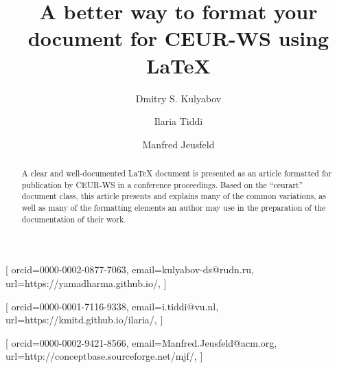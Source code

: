 \documentclass[
]{ceurart}
\begin{document}


\title{A better way to format your document for CEUR-WS using LaTeX}

\tnotemark[1]

\author[1,2]{Dmitry S. Kulyabov}[%
  orcid=0000-0002-0877-7063,
  email=kulyabov-ds@rudn.ru,
  url=https://yamadharma.github.io/,
]
\cormark[1]
\fnmark[1]
\address[1]{Peoples' Friendship University of Russia (RUDN University),
  6 Miklukho-Maklaya St, Moscow, 117198, Russian Federation}
\address[2]{Joint Institute for Nuclear Research,
  6 Joliot-Curie, Dubna, Moscow region, 141980, Russian Federation}

\author[3]{Ilaria Tiddi}[%
  orcid=0000-0001-7116-9338,
  email=i.tiddi@vu.nl,
  url=https://kmitd.github.io/ilaria/,
]
\fnmark[1]
\address[3]{Vrije Universiteit Amsterdam, De Boelelaan 1105, 1081 HV Amsterdam, The Netherlands}

\author[4]{Manfred Jeusfeld}[%
  orcid=0000-0002-9421-8566,
  email=Manfred.Jeusfeld@acm.org,
  url=http://conceptbase.sourceforge.net/mjf/,
]
\fnmark[1]
\address[4]{University of Skövde, Högskolevägen 1, 541 28 Skövde, Sweden}


\begin{abstract}
  A clear and well-documented \LaTeX{} document is presented as an
  article formatted for publication by CEUR-WS in a conference
  proceedings. Based on the ``ceurart'' document class, this article
  presents and explains many of the common variations, as well as many
  of the formatting elements an author may use in the preparation of
  the documentation of their work.
\end{abstract}
\end{document}
